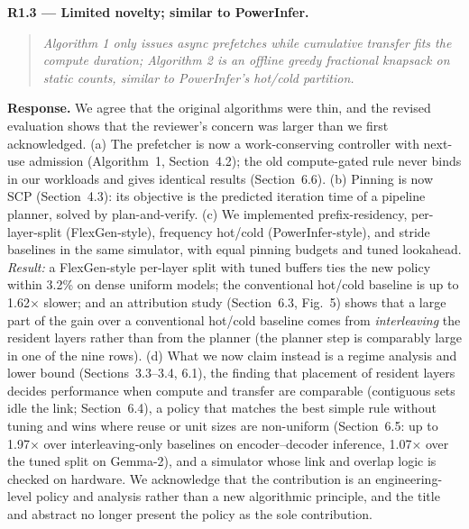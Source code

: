 \documentclass[11pt]{article}
\newcommand{\rc}[1]{\par\medskip\noindent\textbf{#1}}
\newenvironment{comment}{\begin{quote}\itshape}{\end{quote}}
\begin{document}
\rc{R1.3 --- Limited novelty; similar to PowerInfer.}
\begin{comment}Algorithm 1 only issues async prefetches while cumulative transfer fits the compute duration; Algorithm 2 is an offline greedy fractional knapsack on static counts, similar to PowerInfer's hot/cold partition.\end{comment}
\textbf{Response.} We agree that the original algorithms were thin, and the revised evaluation shows that the reviewer's concern was larger than we first acknowledged. (a) The prefetcher is now a work-conserving controller with next-use admission (Algorithm~1, Section~4.2); the old compute-gated rule never binds in our workloads and gives identical results (Section~6.6). (b) Pinning is now SCP (Section~4.3): its objective is the predicted iteration time of a pipeline planner, solved by plan-and-verify. (c) We implemented prefix-residency, per-layer-split (FlexGen-style), frequency hot/cold (PowerInfer-style), and stride baselines in the same simulator, with equal pinning budgets and tuned lookahead. \emph{Result:} a FlexGen-style per-layer split with tuned buffers ties the new policy within 3.2\% on dense uniform models; the conventional hot/cold baseline is up to 1.62$\times$ slower; and an attribution study (Section~6.3, Fig.~5) shows that a large part of the gain over a conventional hot/cold baseline comes from \emph{interleaving} the resident layers rather than from the planner (the planner step is comparably large in one of the nine rows). (d) What we now claim instead is a regime analysis and lower bound (Sections~3.3--3.4, 6.1), the finding that placement of resident layers decides performance when compute and transfer are comparable (contiguous sets idle the link; Section~6.4), a policy that matches the best simple rule without tuning and wins where reuse or unit sizes are non-uniform (Section~6.5: up to 1.97$\times$ over interleaving-only baselines on encoder--decoder inference, 1.07$\times$ over the tuned split on Gemma-2), and a simulator whose link and overlap logic is checked on hardware. We acknowledge that the contribution is an engineering-level policy and analysis rather than a new algorithmic principle, and the title and abstract no longer present the policy as the sole contribution.
\end{document}
